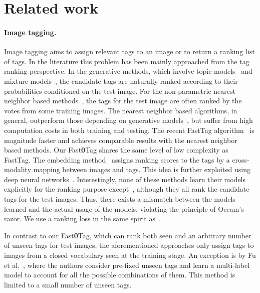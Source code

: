 \documentclass[10pt,twocolumn,letterpaper]{article}
\begin{document}
\section{Related work}
\label{sRelated}

\paragraph{Image tagging.} Image tagging aims to assign relevant tags  to an image or to return a ranking list of tags. In the literature this problem has been mainly approached from the tag ranking perspective. In the generative methods, which involve topic models~\cite{barnard_matching_2003,monay_plsa-based_2004,yakhnenko_annotating_2008,niu_semi-supervised_2014} and mixture models~\cite{lavrenko_model_2003,jeon_automatic_2003,tariq_feature-independent_2015,feng_multiple_2004,carneiro_supervised_2007,dehghan_improving_2014}, the candidate tags are naturally ranked according to their probabilities conditioned on the test image. For the non-parametric nearest neighbor based methods~\cite{makadia_baselines_2010,mei_coherent_2008,li_learning_2009,kalayeh_nmf-knn:_2014,guillaumin_tagprop:_2009,lee_visually_2014,zhu_adaptive_2014}, the tags for the test image are often ranked by the votes from some training images. The nearest neighbor based algorithms, in general, outperform those depending on generative models~\cite{kalayeh_nmf-knn:_2014,li_socializing_2015}, but suffer from high computation costs in both training and testing. The recent FastTag algorithm~\cite{chen_fast_2013} is magnitude faster and achieves comparable results with the nearest neighbor based methods. Our Fast\textbf{0}Tag shares the same level of low complexity as FastTag. The embedding method~\cite{weston_large_2010} assigns ranking scores to the tags by a  cross-modality mapping between images and tags. This idea is further exploited using deep neural networks~\cite{gong_deep_2013}. Interestingly, none of these methods learn their models explicitly for the ranking purpose except~\cite{weston_large_2010,gong_deep_2013}, although they all rank the candidate tags for the test images. Thus, there exists a mismatch between the models learned and the actual usage of the models, violating the principle of Occam's razor. We use a ranking loss in the same spirit as~\cite{weston_large_2010,gong_deep_2013}. 

In contrast to our Fast\textbf{0}Tag, which can rank both seen and an arbitrary number of unseen tags for test images, the aforementioned approaches only assign tags to images from a closed vocabulary seen at the training stage. An exception is by Fu et al.~\cite{fu_transductive_2014}, where the authors consider pre-fixed  unseen tags and learn a multi-label model to account for all the  possible combinations of them. This method is limited to  a small number  of unseen tags. 
\vspace{-10pt}
\end{document}
